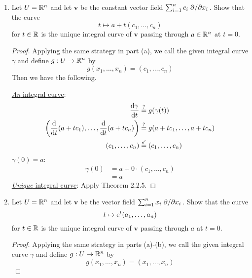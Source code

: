 \documentclass[../psets.tex]{subfiles}
\begin{document}
\begin{enumerate}[label={\textbf{2.2.\roman*.}}]
\begin{enumerate}
\begin{proof}
        \end{proof}
        \item Let $U=\R^n$ and let $\bm{v}$ be the constant vector field $\sum_{i=1}^nc_i\pdv*{x_i}$. Show that the curve
        \begin{equation*}
            t \mapsto a+t(c_1,\dots,c_n)
        \end{equation*}
        for $t\in\R$ is the unique integral curve of $\bm{v}$ passing through $a\in\R^n$ at $t=0$.
        \begin{proof}
            Applying the same strategy in part (a), we call the given integral curve $\gamma$ and define $g:U\to\R^n$ by
            \begin{equation*}
                g(x_1,\dots,x_n) = (c_1,\dots,c_n)
            \end{equation*}
            Then we have the following.\par
            \underline{\emph{An} integral curve}:
            \begin{align*}
                \dv{\gamma}{t} &\stackrel{?}{=} g(\gamma(t))\\
                \left( \dv{t}(a+tc_1),\dots,\dv{t}(a+tc_n) \right) &\stackrel{?}{=} g(a+tc_1,\dots,a+tc_n)\\
                (c_1,\dots,c_n) &\stackrel{\checkmark}{=} (c_1,\dots,c_n)
            \end{align*}
            \underline{$\gamma(0)=a$}:
            \begin{align*}
                \gamma(0) &= a+0\cdot(c_1,\dots,c_n)\\
                &= a
            \end{align*}
            \underline{\emph{Unique} integral curve}:
            Apply Theorem 2.2.5.
        \end{proof}
        \item Let $U=\R^n$ and let $\bm{v}$ be the vector field $\sum_{i=1}^nx_i\pdv*{x_i}$. Show that the curve
        \begin{equation*}
            t \mapsto \e[t](a_1,\dots,a_n)
        \end{equation*}
        for $t\in\R$ is the unique integral curve of $\bm{v}$ passing through $a$ at $t=0$.
        \begin{proof}
            Applying the same strategy in parts (a)-(b), we call the given integral curve $\gamma$ and define $g:U\to\R^n$ by
            \begin{equation*}
                g(x_1,\dots,x_n) = (x_1,\dots,x_n)

\end{equation*}
\end{proof}
\end{enumerate}
\end{enumerate}
\end{document}
